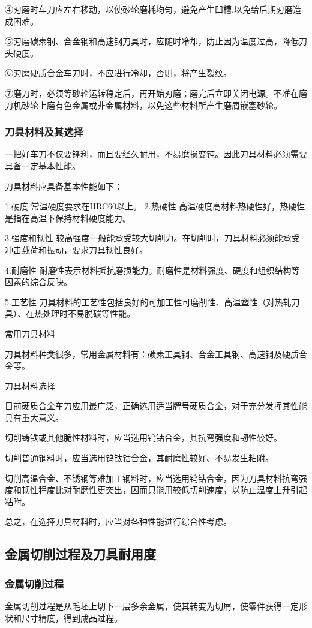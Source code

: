 \documentclass{ctexbook}
\begin{document}
④刃磨时车刀应左右移动，以使砂轮磨耗均匀，避免产生凹槽,以免给后期刃磨造成困难。

⑤刃磨碳素钢、合金钢和高速钢刀具时，应随时冷却，防止因为温度过高，降低刀头硬度。

⑥刃磨硬质合金车刀时，不应进行冷却，否则，将产生裂纹。

⑦磨刀时，必须等砂轮运转稳定后，再开始刃磨；磨完后立即关闭电源。不准在磨刀机砂轮上磨有色金属或非金属材料，以免这些材料所产生磨屑嵌塞砂轮。

\subsubsection{刀具材料及其选择}
一把好车刀不仅要锋利，而且要经久耐用，不易磨损变钝。因此刀具材料必须需要具备一定基本性能。

刀具材料应具备基本性能如下：

1.硬度 常温硬度要求在HRC60以上。
2.热硬性 高温硬度高材料热硬性好，热硬性是指在高温下保持材料硬度能力。

3.强度和韧性 较高强度一般能承受较大切削力。在切削时，刀具材料必须能承受冲击载荷和振动，要求刀具韧性良好。

4.耐磨性 耐磨性表示材料抵抗磨损能力。耐磨性是材料强度、硬度和组织结构等因素的综合反映。

5.工艺性 刀具材料的工艺性包括良好的可加工性可磨削性、高温塑性（对热轧刀具）、在热处理时不易脱碳等性能。

常用刀具材料

刀具材料种类很多，常用金属材料有：碳素工具钢、合金工具钢、高速钢及硬质合金等。

刀具材料选择

目前硬质合金车刀应用最广泛，正确选用适当牌号硬质合金，对于充分发挥其性能具有重大意义。

切削铸铁或其他脆性材料时，应当选用钨钴合金，其抗弯强度和韧性较好。

切削普通钢料时，应当选用钨钛钴合金，其耐磨性较好、不易发生粘附。

切削高温合金、不锈钢等难加工钢料时，应当选用钨钴合金，因为刀具材料抗弯强度和韧性程度比对耐磨性更突出，因而只能用较低切削速度，以防止温度上升引起粘附。

总之，在选择刀具材料时，应当对各种性能进行综合性考虑。

\subsection{金属切削过程及刀具耐用度}
\subsubsection{金属切削过程}
金属切削过程是从毛坯上切下一层多余金属，使其转变为切屑，使零件获得一定形状和尺寸精度，得到成品过程。
\end{document}
